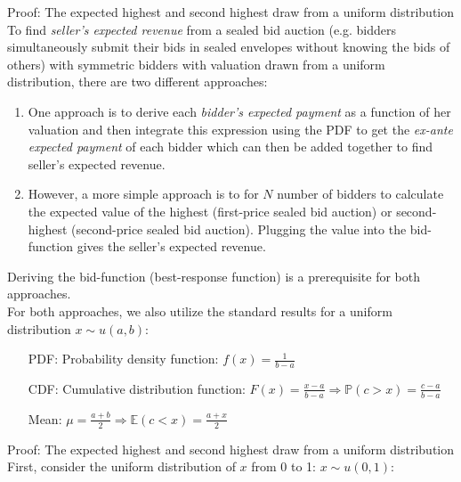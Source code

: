 \begin{frame}{Proof: The expected highest and second highest draw from a uniform distribution}
    To find \textit{seller's expected revenue} from a sealed bid auction (e.g. bidders simultaneously submit their bids in sealed envelopes without knowing the bids of others) with symmetric bidders with valuation drawn from a uniform distribution, there are two different approaches:
    \begin{enumerate}
      \item One approach is to derive each \textit{bidder's expected payment} as a function of her valuation and then integrate this expression using the PDF to get the \textit{ex-ante expected payment} of each bidder which can then be added together to find seller's expected revenue.
      \item However, a more simple approach is to for $N$ number of bidders to calculate the expected value of the highest (first-price sealed bid auction) or second-highest (second-price sealed bid auction). Plugging the value into the bid-function gives the seller's expected revenue.
    \end{enumerate}
    Deriving the bid-function (best-response function) is a prerequisite for both approaches.\\\medskip
    For both approaches, we also utilize the standard results for a uniform distribution $x\sim u(a, b):$
    \begin{enumerate}
      \item[PDF:] Probability density function: $f(x)=\frac{1}{b-a}$
      \item[CDF:] Cumulative distribution function: $F(x)=\frac{x-a}{b-a}\Rightarrow\mathbb{P}(c>x)=\frac{c-a}{b-a}$
      \item[Mean:] $\mu=\frac{a+b}{2}\Rightarrow\mathbb{E}(c<x)=\frac{a+x}{2}$
    \end{enumerate}
\end{frame}




\begin{frame}{Proof: The expected highest and second highest draw from a uniform distribution}
    First, consider the uniform distribution of $x$ from 0 to 1: $x\sim u(0, 1)$:
\end{frame}



